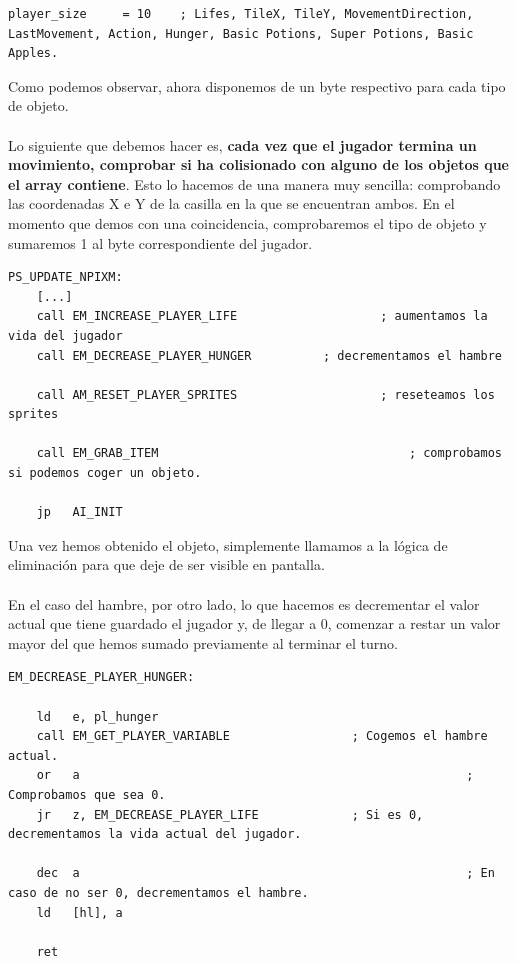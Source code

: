 \begin{lstlisting}[caption={Nuevo Tamaño del Jugador}, label={code:playernewsize}]
player_size 	= 10 	; Lifes, TileX, TileY, MovementDirection, LastMovement, Action, Hunger, Basic Potions, Super Potions, Basic Apples.
\end{lstlisting}

Como podemos observar, ahora disponemos de un byte respectivo para cada tipo de objeto.
\\ \\
Lo siguiente que debemos hacer es, \textbf{cada vez que el jugador termina un movimiento, comprobar si ha colisionado con alguno de los objetos que el array contiene}. Esto lo hacemos de una manera muy sencilla: comprobando las coordenadas X e Y de la casilla en la que se encuentran ambos. En el momento que demos con una coincidencia, comprobaremos el tipo de objeto y sumaremos 1 al byte correspondiente del jugador.

\begin{lstlisting}[caption={Actualizaciones a Final de Movimiento}, label={code:endmovement}]
PS_UPDATE_NPIXM:	
	[...]	
	call EM_INCREASE_PLAYER_LIFE 					; aumentamos la vida del jugador
	call EM_DECREASE_PLAYER_HUNGER 			; decrementamos el hambre

	call AM_RESET_PLAYER_SPRITES 					; reseteamos los sprites

	call EM_GRAB_ITEM 									; comprobamos si podemos coger un objeto.

	jp 	 AI_INIT
\end{lstlisting}

Una vez hemos obtenido el objeto, simplemente llamamos a la lógica de eliminación para que deje de ser visible en pantalla.
\\ \\
En el caso del hambre, por otro lado, lo que hacemos es decrementar el valor actual que tiene guardado el jugador y, de llegar a 0, comenzar a restar un valor mayor del que hemos sumado previamente al terminar el turno.

\begin{lstlisting}[caption={Actualización del Hambre}, label={code:updatehunger}]
EM_DECREASE_PLAYER_HUNGER:
	
	ld 	 e, pl_hunger
	call EM_GET_PLAYER_VARIABLE 				; Cogemos el hambre actual.
	or 	 a 														; Comprobamos que sea 0.
	jr 	 z, EM_DECREASE_PLAYER_LIFE 			; Si es 0, decrementamos la vida actual del jugador.

	dec  a 														; En caso de no ser 0, decrementamos el hambre.
	ld 	 [hl], a

	ret
\end{lstlisting}

